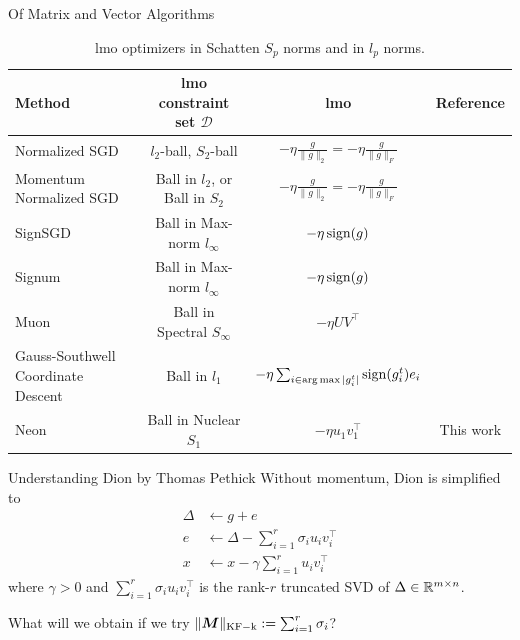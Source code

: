 \documentclass[aspectratio=169]{beamer}
\newcommand{\norm}[1]{\lVert #1\rVert}
\newcommand{\Rmn}{\R^{m\times n}}
\DeclarePairedDelimiter{\normkfk}{\|}{\|_\mathrm{KF-k}}
\begin{document}
\begin{frame}{Of Matrix and Vector Algorithms}
    \footnotesize
    \begin{table}
    \caption{lmo optimizers in Schatten $S_p$ norms and in $l_p$ norms.}
    \label{tbl:mat_vs_vec_lmo}
    \begin{tabularx}{\linewidth}{|>{\raggedright\arraybackslash}X|c|c|c|}
    \hline
    Method & lmo constraint set $\mathcal D$ & lmo & Reference \\
    \hline\hline
    Normalized SGD & $l_2$-ball, $S_2$-ball & $-\eta \tfrac{g}{\norm{g}_2} = -\eta \tfrac{g}{\norm{g}_F}$ & \citep{hazan2015beyond} \\
    Momentum Normalized SGD & Ball in $l_2$, or Ball in $S_2$ & $-\eta \tfrac{g}{\norm{g}_2} = -\eta\tfrac{g}{\norm{g}_F}$ & \citep{cutkosky2020momentum}\\
    \hline
    SignSGD & Ball in Max-norm $l_\infty$ & $-\eta \operatorname{sign}(g)$ & \citep[Thm. 1]{bernstein2018signsgd} \\
    Signum  & Ball in Max-norm $l_\infty$ & $-\eta \operatorname{sign}(g)$ & \citep[Thm. 3]{bernstein2018signsgd} \\
    \hdashline
    Muon & Ball in Spectral $S_\infty$ & $-\eta UV^\top$ & \citep{jordan2024muon} \\
    \hline
    Gauss-Southwell Coordinate Descent & Ball in $l_1$ & $-\eta \sum_{i \in \operatorname*{arg\,max}|g_i^t|} \operatorname{sign}(g_i^t)e_i$ & \citep[p.19]{shi2016primer}\\
    \hdashline 
    Neon & Ball in Nuclear $S_1$ & $-\eta u_1 v_1^\top$ & This work\\
    \hline
    \end{tabularx}
    \end{table}
\end{frame}
\begin{frame}{Understanding Dion by Thomas Pethick}
    Without momentum, Dion is simplified to
    $$
    \begin{aligned}
    \Delta &\leftarrow g + e  \\
    e &\leftarrow \Delta - \sum_{i=1}^r \sigma_i u_i v_i^\top \\
    x &\leftarrow x - \gamma \sum_{i=1}^r u_i v_i^\top
    \end{aligned}
    $$
    where $\gamma > 0$ and $\sum_{i=1}^r \sigma_i u_iv^\top_i$ is the rank-$r$ truncated SVD of $\Delta \in \Rmn$.
    \vspace{0.4em}

    \faQuestionCircle \space What will we obtain if we try $\normkfk{\mM}:=\sum_{i=1}^r{\sigma_i}$?
    \end{frame}
\end{document}
